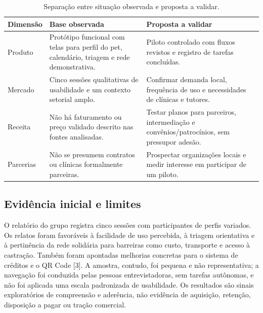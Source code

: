 \documentclass[12pt,a4paper]{article}
\begin{document}
\begin{table}[H]
\centering
\small
\caption{Separação entre situação observada e proposta a validar.}
\begin{tabularx}{\textwidth}{P{3.1cm}YY}
\toprule
\textbf{Dimensão} & \textbf{Base observada} & \textbf{Proposta a validar} \\
\midrule
Produto & Protótipo funcional com telas para perfil do pet, calendário, triagem e rede demonstrativa. & Piloto controlado com fluxos revistos e registro de tarefas concluídas. \\
Mercado & Cinco sessões qualitativas de usabilidade e um contexto setorial amplo. & Confirmar demanda local, frequência de uso e necessidades de clínicas e tutores. \\
Receita & Não há faturamento ou preço validado descrito nas fontes analisadas. & Testar planos para parceiros, intermediação e convênios/patrocínios, sem pressupor adesão. \\
Parcerias & Não se presumem contratos ou clínicas formalmente parceiras. & Prospectar organizações locais e medir interesse em participar de um piloto. \\
\bottomrule
\end{tabularx}
\end{table}

\subsection{Evidência inicial e limites}

O relatório do grupo registra cinco sessões com participantes de perfis variados. Os relatos foram favoráveis à facilidade de uso percebida, à triagem orientativa e à pertinência da rede solidária para barreiras como custo, transporte e acesso à castração. Também foram apontadas melhorias concretas para o sistema de créditos e o QR Code [3]. A amostra, contudo, foi pequena e não representativa; a navegação foi conduzida pelas pessoas entrevistadoras, sem tarefas autônomas, e não foi aplicada uma escala padronizada de usabilidade. Os resultados são sinais exploratórios de compreensão e aderência, não evidência de aquisição, retenção, disposição a pagar ou tração comercial.
\end{document}
